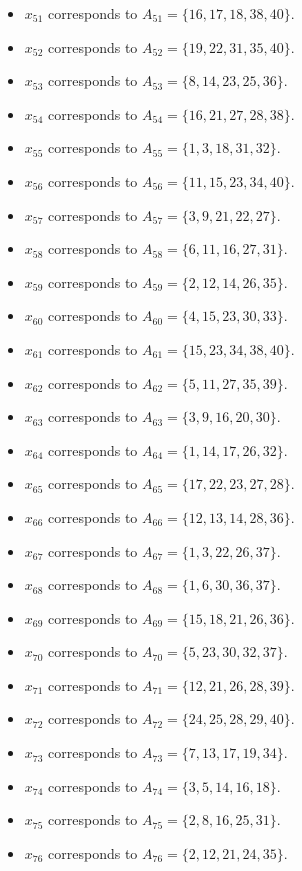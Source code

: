 \documentclass[11pt]{article}
\begin{document}
\begin{itemize}
\item $x_{51}$ corresponds to $A_{51}=\{16, 17, 18, 38, 40\}$.
\item $x_{52}$ corresponds to $A_{52}=\{19, 22, 31, 35, 40\}$.
\item $x_{53}$ corresponds to $A_{53}=\{8, 14, 23, 25, 36\}$.
\item $x_{54}$ corresponds to $A_{54}=\{16, 21, 27, 28, 38\}$.
\item $x_{55}$ corresponds to $A_{55}=\{1, 3, 18, 31, 32\}$.
\item $x_{56}$ corresponds to $A_{56}=\{11, 15, 23, 34, 40\}$.
\item $x_{57}$ corresponds to $A_{57}=\{3, 9, 21, 22, 27\}$.
\item $x_{58}$ corresponds to $A_{58}=\{6, 11, 16, 27, 31\}$.
\item $x_{59}$ corresponds to $A_{59}=\{2, 12, 14, 26, 35\}$.
\item $x_{60}$ corresponds to $A_{60}=\{4, 15, 23, 30, 33\}$.
\item $x_{61}$ corresponds to $A_{61}=\{15, 23, 34, 38, 40\}$.
\item $x_{62}$ corresponds to $A_{62}=\{5, 11, 27, 35, 39\}$.
\item $x_{63}$ corresponds to $A_{63}=\{3, 9, 16, 20, 30\}$.
\item $x_{64}$ corresponds to $A_{64}=\{1, 14, 17, 26, 32\}$.
\item $x_{65}$ corresponds to $A_{65}=\{17, 22, 23, 27, 28\}$.
\item $x_{66}$ corresponds to $A_{66}=\{12, 13, 14, 28, 36\}$.
\item $x_{67}$ corresponds to $A_{67}=\{1, 3, 22, 26, 37\}$.
\item $x_{68}$ corresponds to $A_{68}=\{1, 6, 30, 36, 37\}$.
\item $x_{69}$ corresponds to $A_{69}=\{15, 18, 21, 26, 36\}$.
\item $x_{70}$ corresponds to $A_{70}=\{5, 23, 30, 32, 37\}$.
\item $x_{71}$ corresponds to $A_{71}=\{12, 21, 26, 28, 39\}$.
\item $x_{72}$ corresponds to $A_{72}=\{24, 25, 28, 29, 40\}$.
\item $x_{73}$ corresponds to $A_{73}=\{7, 13, 17, 19, 34\}$.
\item $x_{74}$ corresponds to $A_{74}=\{3, 5, 14, 16, 18\}$.
\item $x_{75}$ corresponds to $A_{75}=\{2, 8, 16, 25, 31\}$.
\item $x_{76}$ corresponds to $A_{76}=\{2, 12, 21, 24, 35\}$.

\end{itemize}
\end{document}

